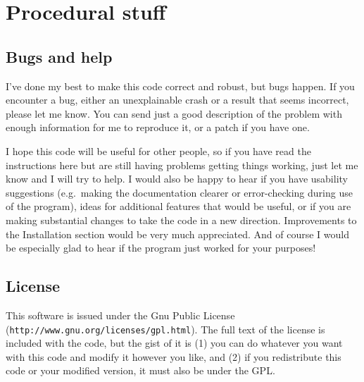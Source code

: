 \documentclass[10pt]{article}
\begin{document}


\section*{Procedural stuff}

\subsection*{Bugs and help}

I've done my best to make this code correct and robust, but bugs happen.
If you encounter a bug, either an unexplainable crash or a result that seems incorrect, please let me know.
You can send just a good description of the problem with enough information for me to reproduce it, or a patch if you have one.

I hope this code will be useful for other people, so if you have read the instructions here but are still having problems getting things working, just let me know and I will try to help.
I would also be happy to hear if you have usability suggestions (e.g.\ making the documentation clearer or error-checking during use of the program), ideas for additional features that would be useful, or if you are making substantial changes to take the code in a new direction.
Improvements to the Installation section would be very much appreciated.
And of course I would be especially glad to hear if the program just worked for your purposes!

\subsection*{License}

This software is issued under the Gnu Public License (\texttt{http://www.gnu.org/licenses/gpl.html}).  The full text of the license is included with the code, but the gist of it is (1) you can do whatever you want with this code and modify it however you like, and (2) if you redistribute this code or your modified version, it must also be under the GPL.
\end{document}
